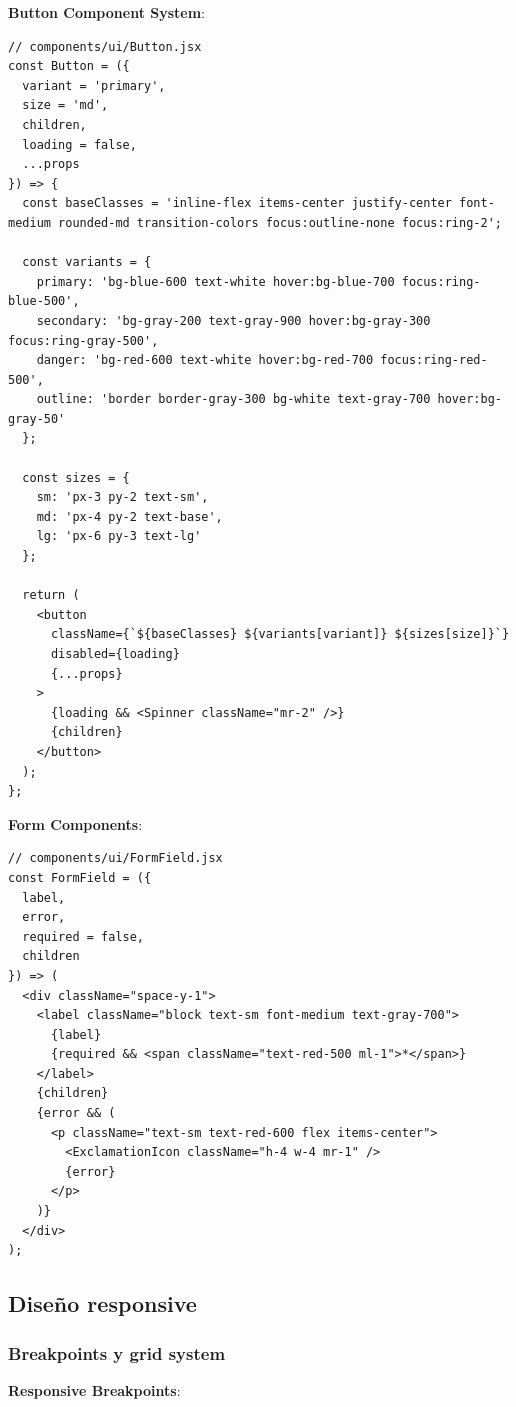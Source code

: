 \documentclass[12pt,a4paper,oneside]{report}
\begin{document}
\textbf{Button Component System}:

\begin{lstlisting}
// components/ui/Button.jsx
const Button = ({ 
  variant = 'primary', 
  size = 'md', 
  children, 
  loading = false,
  ...props 
}) => {
  const baseClasses = 'inline-flex items-center justify-center font-medium rounded-md transition-colors focus:outline-none focus:ring-2';
  
  const variants = {
    primary: 'bg-blue-600 text-white hover:bg-blue-700 focus:ring-blue-500',
    secondary: 'bg-gray-200 text-gray-900 hover:bg-gray-300 focus:ring-gray-500',
    danger: 'bg-red-600 text-white hover:bg-red-700 focus:ring-red-500',
    outline: 'border border-gray-300 bg-white text-gray-700 hover:bg-gray-50'
  };
  
  const sizes = {
    sm: 'px-3 py-2 text-sm',
    md: 'px-4 py-2 text-base',
    lg: 'px-6 py-3 text-lg'
  };
  
  return (
    <button 
      className={`${baseClasses} ${variants[variant]} ${sizes[size]}`}
      disabled={loading}
      {...props}
    >
      {loading && <Spinner className="mr-2" />}
      {children}
    </button>
  );
};
\end{lstlisting}

\textbf{Form Components}:

\begin{lstlisting}
// components/ui/FormField.jsx
const FormField = ({ 
  label, 
  error, 
  required = false, 
  children 
}) => (
  <div className="space-y-1">
    <label className="block text-sm font-medium text-gray-700">
      {label}
      {required && <span className="text-red-500 ml-1">*</span>}
    </label>
    {children}
    {error && (
      <p className="text-sm text-red-600 flex items-center">
        <ExclamationIcon className="h-4 w-4 mr-1" />
        {error}
      </p>
    )}
  </div>
);
\end{lstlisting}

\subsection{Diseño responsive}\label{diseuxf1o-responsive}

\subsubsection{Breakpoints y grid
system}\label{breakpoints-y-grid-system}

\textbf{Responsive Breakpoints}:
\end{document}
